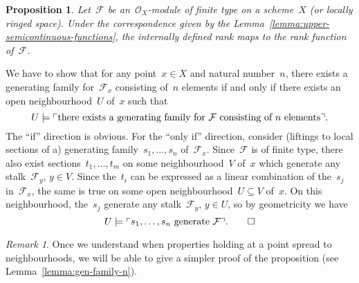 \documentclass[10pt,reqno,a4paper]{amsbook}
\makeatletter
\theoremstyle{definition}
\theoremstyle{plain}
\newtheorem{prop}[defn]{Proposition}
\theoremstyle{remark}
\newtheorem{rem}[defn]{Remark}
\newcommand{\F}{\mathcal{F}}
\renewcommand{\O}{\mathcal{O}}
\newcommand{\?}{\,{:}\,}
\renewcommand{\_}{\mathpunct{.}\,}
\newcommand{\speak}[1]{\ulcorner\text{\textnormal{#1}}\urcorner}
\renewenvironment{proof}[1][\proofname]{\par
  \pushQED{\qed}%
  \normalfont \topsep6\p@\@plus6\p@\relax
  \trivlist
  \item[\hskip\labelsep
        \itshape
    #1\@addpunct{.}]\ignorespaces
}{%
  \popQED\endtrivlist\@endpefalse
}
\makeatother
\begin{document}
\begin{prop}\label{prop:rank-function-internally}
Let~$\F$ be an~$\O_X$-module of finite type on a scheme~$X$ (or locally ringed
space). Under the correspondence given by the Lemma~\ref{lemma:upper-semicontinuous-functions}, the internally
defined rank maps to the rank function of~$\F$.
\end{prop}
\begin{proof}
We have to show that for any point~$x \in X$ and natural number~$n$, there
exists a generating family for~$\F_x$ consisting of~$n$
elements if and only if there exists an open neighbourhood~$U$ of~$x$ such that
\[ U \models \speak{there exists a generating family
for~$\F$ consisting of~$n$ elements}. \]
The ``if'' direction is obvious. For the ``only if'' direction, consider
(liftings to local sections of a)
generating family~$s_1,\ldots,s_n$ of~$\F_x$. Since~$\F$ is of finite type,
there also exist sections~$t_1,\ldots,t_m$ on some neighbourhood~$V$ of~$x$ which
generate any stalk~$\F_y$, $y \in V$. Since the~$t_i$ can be expressed as a
linear combination of the~$s_j$ in~$\F_x$, the same is true on some open
neighbourhood~$U \subseteq V$ of~$x$. On this neighbourhood, the~$s_j$ generate
any stalk~$\F_y$, $y \in U$, so by geometricity we have
\[ U \models \speak{$s_1,\ldots,s_n$ generate~$\F$}. \qedhere \]
\end{proof}
\begin{rem}Once we understand when properties holding at a point spread to
neighbourhoods, we will be able to give a simpler proof of the proposition (see
Lemma~\ref{lemma:gen-family-n}).\end{rem}
\end{document}
